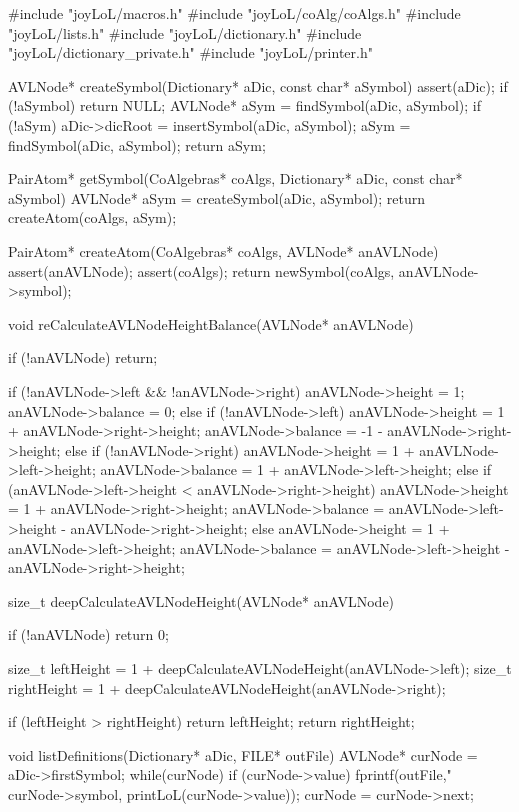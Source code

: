 #include "joyLoL/macros.h"
#include "joyLoL/coAlg/coAlgs.h"
#include "joyLoL/lists.h"
#include "joyLoL/dictionary.h"
#include "joyLoL/dictionary_private.h"
#include "joyLoL/printer.h"

AVLNode* createSymbol(Dictionary* aDic, const char* aSymbol) {
  assert(aDic);
  if (!aSymbol) return NULL;
  AVLNode* aSym = findSymbol(aDic, aSymbol);
  if (!aSym) {
    aDic->dicRoot = insertSymbol(aDic, aSymbol);
    aSym = findSymbol(aDic, aSymbol);
  }
  return aSym;
}

PairAtom* getSymbol(CoAlgebras* coAlgs,
                    Dictionary* aDic,
                    const char* aSymbol) {
  AVLNode* aSym = createSymbol(aDic, aSymbol);
  return createAtom(coAlgs, aSym);
}

PairAtom* createAtom(CoAlgebras* coAlgs, AVLNode* anAVLNode) {
  assert(anAVLNode);
  assert(coAlgs);
  return newSymbol(coAlgs, anAVLNode->symbol);
}

void reCalculateAVLNodeHeightBalance(AVLNode* anAVLNode) {
  if (!anAVLNode) return;

  if (!anAVLNode->left && !anAVLNode->right) {
    anAVLNode->height  = 1;
    anAVLNode->balance = 0;
  } else if (!anAVLNode->left) {
    anAVLNode->height  =  1 + anAVLNode->right->height;
    anAVLNode->balance = -1 - anAVLNode->right->height;
  } else if (!anAVLNode->right) {
    anAVLNode->height  = 1 + anAVLNode->left->height;
    anAVLNode->balance = 1 + anAVLNode->left->height;
  } else if (anAVLNode->left->height < anAVLNode->right->height) {
    anAVLNode->height  = 1 + anAVLNode->right->height;
    anAVLNode->balance = anAVLNode->left->height - anAVLNode->right->height;
  } else {
    anAVLNode->height  = 1 + anAVLNode->left->height;
    anAVLNode->balance = anAVLNode->left->height - anAVLNode->right->height;
  }
}

size_t deepCalculateAVLNodeHeight(AVLNode* anAVLNode) {
  if (!anAVLNode) return 0;

  size_t leftHeight = 1 + deepCalculateAVLNodeHeight(anAVLNode->left);
  size_t rightHeight = 1 + deepCalculateAVLNodeHeight(anAVLNode->right);

  if (leftHeight > rightHeight) return leftHeight;
  return rightHeight;
}

void listDefinitions(Dictionary* aDic, FILE* outFile) {
  AVLNode* curNode = aDic->firstSymbol;
  while(curNode) {
    if (curNode->value) {
      fprintf(outFile,"%
              curNode->symbol, printLoL(curNode->value));
    }
    curNode = curNode->next;
  }
}

